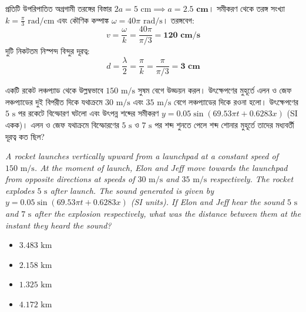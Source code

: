 \documentclass[12pt, a4paper]{article}
\begin{document}
\begin{tcolorbox}[solutionbox={সমাধান (Solution)}]
    \noindent
    প্রতিটি উপরিপাতিত অগ্রগামী তরঙ্গের বিস্তার $2a = 5\text{ cm} \implies a = \mathbf{2.5\text{ cm}}$। সমীকরণ থেকে তরঙ্গ সংখ্যা $k = \frac{\pi}{3}\text{ rad/cm}$ এবং কৌণিক কম্পাঙ্ক $\omega = 40\pi\text{ rad/s}$। তরঙ্গবেগ:
    \[ v = \frac{\omega}{k} = \frac{40\pi}{\pi/3} = \mathbf{120\text{ cm/s}} \]
    দুটি নিকটতম নিস্পন্দ বিন্দুর দূরত্ব:
    \[ d = \frac{\lambda}{2} = \frac{\pi}{k} = \frac{\pi}{\pi/3} = \mathbf{3\text{ cm}} \]
\end{tcolorbox}

\vspace{2em}

\begin{tcolorbox}[questionbox={প্রশ্ন (Question) 19}]
    \noindent
    একটি রকেট লঞ্চপ্যাড থেকে উল্লম্বভাবে $150\text{ m/s}$ সুষম বেগে উড্ডয়ন করল। উৎক্ষেপণের মুহূর্তে এলন ও জেফ লঞ্চপ্যাডের দুই বিপরীত দিকে যথাক্রমে $30\text{ m/s}$ এবং $35\text{ m/s}$ বেগে লঞ্চপ্যাডের দিকে রওনা হলো। উৎক্ষেপণের $5\text{ s}$ পর রকেটে বিস্ফোরণ ঘটলো এবং উৎপন্ন শব্দের সমীকরণ $y = 0.05 \sin(69.53\pi t + 0.6283 x)$ (SI একক)। এলন ও জেফ যথাক্রমে বিস্ফোরণের $5\text{ s}$ ও $7\text{ s}$ পর শব্দ শুনতে পেলে শব্দ শোনার মুহূর্তে তাদের মধ্যবর্তী দূরত্ব কত ছিল?
    
    \vspace{0.8em}
    \begin{english}
    \noindent\textit{\color{darkgray}
    A rocket launches vertically upward from a launchpad at a constant speed of $150\text{ m/s}$. At the moment of launch, Elon and Jeff move towards the launchpad from opposite directions at speeds of $30\text{ m/s}$ and $35\text{ m/s}$ respectively. The rocket explodes $5\text{ s}$ after launch. The sound generated is given by $y = 0.05 \sin(69.53\pi t + 0.6283 x)$ (SI units). If Elon and Jeff hear the sound $5\text{ s}$ and $7\text{ s}$ after the explosion respectively, what was the distance between them at the instant they heard the sound?
    }
    \end{english}
\end{tcolorbox}

\begin{itemize}[label={}, leftmargin=1cm, itemsep=0.5em]
    \item[\textbf{A)}] $3.483\text{ km}$
    \item[\textbf{B)}] $2.158\text{ km}$
    \item[\textbf{C)}] $1.325\text{ km}$
    \item[\textbf{D)}] $4.172\text{ km}$
\end{itemize}
\end{document}
